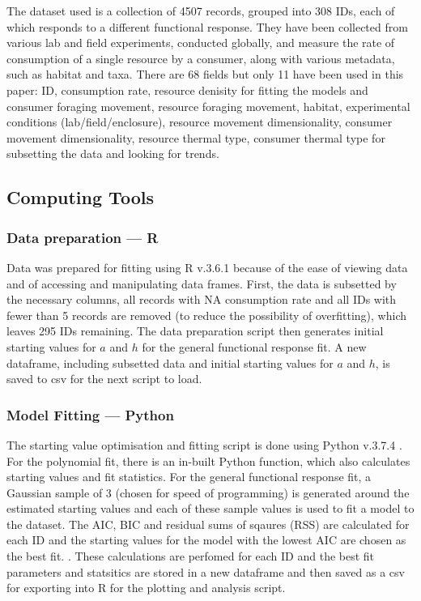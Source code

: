 \documentclass[11pt, a4paper, titlepage]{article}
\begin{document}
The dataset used is a collection of 4507 records, grouped into 308 IDs, each of which responds to a different functional response. They have been collected from various lab and field experiments, conducted globally, and measure the rate of consumption of a single resource by a consumer, along with various metadata, such as habitat and taxa. There are 68 fields but only 11  have been used in this paper: ID, consumption rate, resource denisity for fitting the models and consumer foraging movement, resource foraging movement, habitat, experimental conditions (lab/field/enclosure), resource movement dimensionality, consumer movement dimensionality, resource thermal type, consumer thermal type for subsetting the data and looking for trends.

\subsection{Computing Tools}

\subsubsection{Data preparation — R}

Data was prepared for fitting using R v.3.6.1 \parencite{R} because of the ease of viewing data and of accessing and manipulating data frames. First, the data is subsetted by the necessary columns, all records with NA consumption rate and all IDs with fewer than 5 records are removed (to reduce the possibility of overfitting), which leaves 295 IDs remaining. The data preparation script then generates initial starting values for $a$ and $h$ for the general functional response fit. A new dataframe, including subsetted data and initial starting values for $a$ and $h$, is saved to csv for the next script to load.

\subsubsection{Model Fitting — Python}
The starting value optimisation and fitting script is done using Python v.3.7.4 \parencite{Python}. For the polynomial fit, there is an in-built Python function, which also calculates starting values and fit statistics. For the general functional response fit, a Gaussian sample of 3 (chosen for speed of programming) is generated around the estimated starting values and each of these sample values is used to fit a model to the dataset. The AIC, BIC and residual sums of sqaures (RSS) are calculated for each ID and the starting values for the model with the lowest AIC are chosen as the best fit. \parencite{Johnson2004}.  These calculations are perfomed for each ID and the best fit parameters and statsitics are stored in a new dataframe and then saved as a csv for exporting into R for the plotting and analysis script.
\end{document}
